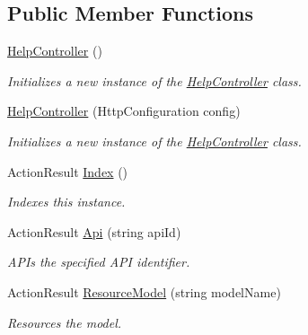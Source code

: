 \subsection*{Public Member Functions}
\begin{DoxyCompactItemize}
\item 
\hyperlink{class_open_1_1_g_i_1_1hypermart_1_1_areas_1_1_help_page_1_1_controllers_1_1_help_controller_afa0b9b820c64c6b4f58818ea7a8fbee9}{Help\+Controller} ()
\begin{DoxyCompactList}\small\item\em Initializes a new instance of the \hyperlink{class_open_1_1_g_i_1_1hypermart_1_1_areas_1_1_help_page_1_1_controllers_1_1_help_controller}{Help\+Controller} class. \end{DoxyCompactList}\item 
\hyperlink{class_open_1_1_g_i_1_1hypermart_1_1_areas_1_1_help_page_1_1_controllers_1_1_help_controller_a5701fb0613147c92bcf47b40636fbb4c}{Help\+Controller} (Http\+Configuration config)
\begin{DoxyCompactList}\small\item\em Initializes a new instance of the \hyperlink{class_open_1_1_g_i_1_1hypermart_1_1_areas_1_1_help_page_1_1_controllers_1_1_help_controller}{Help\+Controller} class. \end{DoxyCompactList}\item 
Action\+Result \hyperlink{class_open_1_1_g_i_1_1hypermart_1_1_areas_1_1_help_page_1_1_controllers_1_1_help_controller_a4c63414e59364e8ce99be20a5c909da8}{Index} ()
\begin{DoxyCompactList}\small\item\em Indexes this instance. \end{DoxyCompactList}\item 
Action\+Result \hyperlink{class_open_1_1_g_i_1_1hypermart_1_1_areas_1_1_help_page_1_1_controllers_1_1_help_controller_a5f4e23a5d390343976a5b04f7a3e9344}{Api} (string api\+Id)
\begin{DoxyCompactList}\small\item\em A\+P\+Is the specified A\+P\+I identifier. \end{DoxyCompactList}\item 
Action\+Result \hyperlink{class_open_1_1_g_i_1_1hypermart_1_1_areas_1_1_help_page_1_1_controllers_1_1_help_controller_a374c9c2d8d4630c433a397b3ac76c53c}{Resource\+Model} (string model\+Name)
\begin{DoxyCompactList}\small\item\em Resources the model. \end{DoxyCompactList}\end{DoxyCompactItemize}
